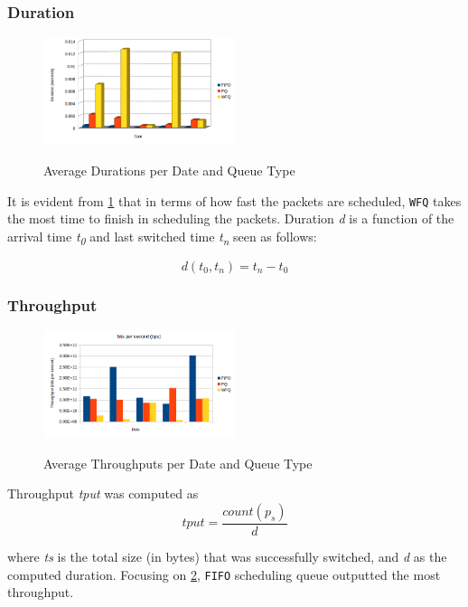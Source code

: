 \documentclass[journal]{IEEE/IEEEtran}
\begin{document}
\subsubsection{Duration}

\begin{figure}
\includegraphics[width=0.5\textwidth]{duration}
\label{fig:duration}\caption{Average Durations per Date and Queue Type}
\end{figure}

It is evident from \ref{fig:duration} that in terms of how fast the packets are scheduled, \texttt{WFQ} takes the most time to finish in scheduling the packets. Duration \textit{d} is a function of the arrival time \textit{t\textsubscript{0}} and last switched time \textit{t\textsubscript{n}} seen as follows:

\[
	d(t_0, t_n) = t_n - t_0
\]

\subsubsection{Throughput}
\begin{figure}
\includegraphics[width=0.5\textwidth]{throughput}
\label{fig:throughput}\caption{Average Throughputs per Date and Queue Type}
\end{figure}

Throughput \textit{tput} was computed as 
\[
	tput = \frac{count(p_s)}{d}
\]

where \textit{ts} is the total size (in bytes) that was successfully switched, and \textit{d} as the computed duration. Focusing on \ref{fig:throughput}, \texttt{FIFO} scheduling queue outputted the most throughput.
\end{document}
